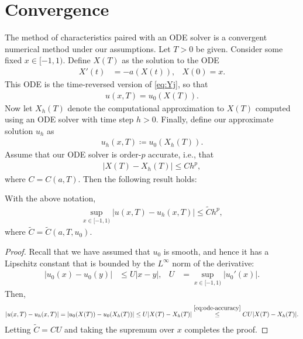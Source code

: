 \documentclass[11pt]{amsart}
\begin{document}
  \section{Convergence}
  The method of characteristics paired with an ODE solver is a convergent numerical method under our assumptions. Let $T >0$ be given. Consider some fixed $x \in [-1,1)$. Define $X(T)$ as the solution to the ODE
    \begin{align}\label{eq:X-ode}
      X'(t) &= -a(X(t)), & X(0) = x.
    \end{align}
    This ODE is the time-reversed version of \eqref{eq:Yj}, so that 
    \begin{align*}
      u(x,T) = u_0(X(T)).
    \end{align*}
    Now let $X_h(T)$ denote the computational approximation to $X(T)$ computed using an ODE solver with time step $h > 0$. Finally, define our approximate solution $u_h$ as
    \begin{align*}
      u_h(x,T) \coloneqq u_0(X_h(T)).
    \end{align*}
    Assume that our ODE solver is order-$p$ accurate, i.e., that
    \begin{align}\label{eq:ode-accuracy}
      \left| X(T) - X_h(T) \right| \leq C h^p,
    \end{align}
    where $C = C(a,T)$. Then the following result holds:
  \begin{proposition}
    With the above notation,
    \begin{align}\label{eq:ode-accuracy}
      \sup_{x \in [-1,1)} \left| u(x,T) - u_h(x,T) \right| \leq \widetilde{C} h^p,
    \end{align}
    where $\widetilde{C} = \widetilde{C}(a, T, u_0)$.
  \end{proposition}
  \begin{proof}
    Recall that we have assumed that $u_0$ is smooth, and hence it has a Lipschitz constant that is bounded by the $L^\infty$ norm of the derivative:
    \begin{align*}
      \left| u_0(x) - u_0(y) \right| &\leq U |x - y|, & U &= \sup_{x \in [-1,1)} |u_0'(x)|.
    \end{align*}
    Then,
    \begin{align*}
      \left| u(x,T) - u_h(x,T) \right| = \left| u_0(X(T)) - u_0(X_h(T)) \right| \leq U | X(T) - X_h(T)| \stackrel{\eqref{eq:ode-accuracy}}{\leq} C U |X(T) - X_h(T)|.
    \end{align*}
    Letting $\widetilde{C} = C U$ and taking the supremum over $x$ completes the proof.
  \end{proof}
\end{document}

